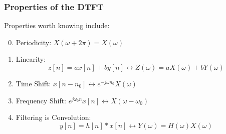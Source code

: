 \documentclass{beamer}
\begin{document}
\begin{frame}
  \frametitle{Properties of the DTFT}

  Properties worth knowing  include:
  \begin{enumerate}
    \setcounter{enumi}{-1}
  \item Periodicity: $X(\omega+2\pi)=X(\omega)$
  \item Linearity:
    \[z[n]=ax[n]+by[n]\leftrightarrow Z(\omega)=aX(\omega)+bY(\omega)
    \]
  \item Time Shift: $x[n-n_0]\leftrightarrow e^{-j\omega n_0}X(\omega)$
  \item Frequency Shift: $e^{j\omega_0 n}x[n]\leftrightarrow X(\omega-\omega_0)$
  \item Filtering is Convolution:
    \[
    y[n]=h[n]\ast x[n]\leftrightarrow Y(\omega)=H(\omega)X(\omega)
    \]
  \end{enumerate}
\end{frame}
\end{document}
